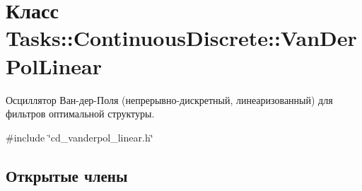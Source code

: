 \hypertarget{class_tasks_1_1_continuous_discrete_1_1_van_der_pol_linear}{}\section{Класс Tasks\+:\+:Continuous\+Discrete\+:\+:Van\+Der\+Pol\+Linear}
\label{class_tasks_1_1_continuous_discrete_1_1_van_der_pol_linear}


Осциллятор Ван-\/дер-\/Поля (непрерывно-\/дискретный, линеаризованный) для фильтров оптимальной структуры.  




{\ttfamily \#include \char`\"{}cd\+\_\+vanderpol\+\_\+linear.\+h\char`\"{}}

\subsection*{Открытые члены}
